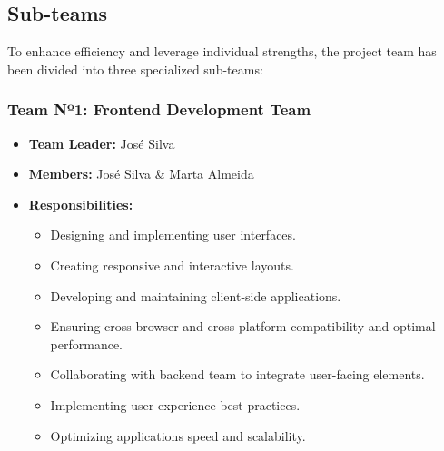 \subsection{Sub-teams}
\label{subsec:sub_teams} 

To enhance efficiency and leverage individual strengths, the project team has been divided into three specialized sub-teams:

\subsubsection{Team Nº1: Frontend Development Team}
\begin{itemize}
    \item \textbf{Team Leader:} José Silva 
    \item \textbf{Members:} José Silva \& Marta Almeida
    \item \textbf{Responsibilities:}
    \begin{itemize}
        \item Designing and implementing user interfaces.
        \item Creating responsive and interactive layouts.
        \item Developing and maintaining client-side applications.
        \item Ensuring cross-browser and cross-platform compatibility and optimal performance.
        \item Collaborating with backend team to integrate user-facing elements.
        \item Implementing user experience best practices.
        \item Optimizing applications speed and scalability.
    \end{itemize}
\end{itemize} 

